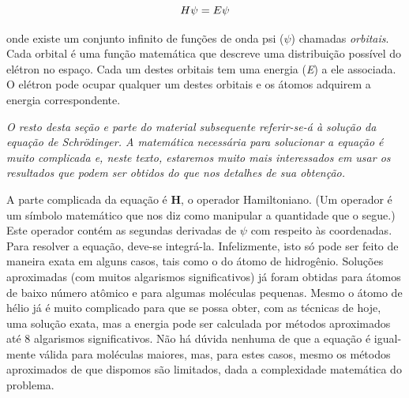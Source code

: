 \begin{equation}
    \setlength{\topsep}{.5ex}
    H\psi = E\psi
\end{equation}

\noindent onde existe um conjunto infinito de funções de onda psi ($\psi$) chamadas \textit{orbitais}. Cada orbital é uma função matemática que descreve uma distribuição possível do elétron no espaço. Cada um destes orbitais tem uma energia (\textit{E}) a ele associada. O elétron pode ocupar qualquer um destes orbitais e os átomos adquirem a energia correspondente. 

\par\bigskip
\noindent\emph{O resto desta seção e parte do material subsequente referir-se-á à solução da equação de Schrödinger. A matemática necessária para solucionar a equação é muito complicada e, neste texto, estaremos muito mais interessados em usar os resultados que podem ser obtidos do que nos detalhes de sua obtenção.}
\par\bigskip

A parte complicada da equação é \textbf{H}, o operador Hamiltoniano. (Um operador é um símbolo matemático que nos diz como manipular a quantidade que o segue.) Este operador contém as segundas derivadas de $\psi$ com respeito às coordenadas. Para resolver a equação, deve-se integrá-la. Infelizmente, isto só pode ser feito de maneira exata em alguns casos, tais como o do átomo de hidrogênio. Soluções aproximadas (com muitos algarismos significativos) já foram obtidas para átomos de baixo número atômico e para algumas moléculas pequenas. Mesmo o átomo de hélio já é muito complicado para que se possa obter, com as técnicas de hoje, uma solução exata, mas a energia pode ser calculada por métodos aproximados até 8 algarismos significativos. Não há dúvida nenhuma de que a equação é igual-mente válida para moléculas maiores, mas, para estes casos, mesmo os métodos aproximados de que dispomos são limitados, dada a complexidade matemática do problema. 

